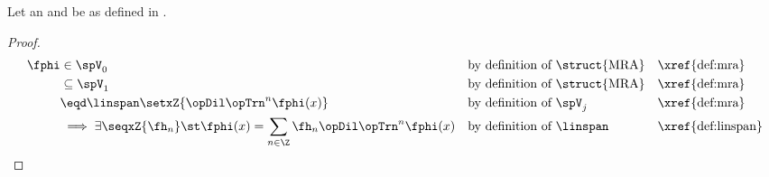 \begin{theorem}
\label{thm:h->phi}
\label{thm:dilation_eq}
Let an  and  be as defined in .
\end{theorem}
\begin{proof}
  \begin{align*}
    \fphi &\in \spV_0
          && \text{by definition of \struct{MRA}} && \text{\xref{def:mra}}
        \\&\subseteq \spV_1
          && \text{by definition of \struct{MRA}} && \text{\xref{def:mra}}
        \\&\eqd \linspan\setxZ{\opDil\opTrn^n\fphi(x)}
          && \text{by definition of $\spV_j$}     && \text{\xref{def:mra}}
        \\&\implies 
           \exists \seqxZ{\fh_n} \st
              \fphi(x) = \sum_{n\in\Z}\fh_n \opDil \opTrn^n \fphi(x)
          && \text{by definition of $\linspan$}   && \text{\xref{def:linspan}}
  \end{align*}
\end{proof}

